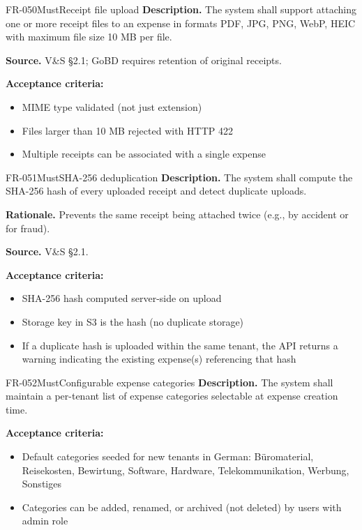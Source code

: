 \documentclass[11pt,a4paper]{article}
\begin{document}
\begin{requirement}{FR-050}{Must}{Receipt file upload}
\textbf{Description.} The system shall support attaching one or more receipt files to an expense in formats PDF, JPG, PNG, WebP, HEIC with maximum file size 10 MB per file.

\textbf{Source.} V\&S \S2.1; GoBD requires retention of original receipts.

\textbf{Acceptance criteria:}
\begin{itemize}
    \item MIME type validated (not just extension)
    \item Files larger than 10 MB rejected with HTTP 422
    \item Multiple receipts can be associated with a single expense
\end{itemize}
\end{requirement}

\begin{requirement}{FR-051}{Must}{SHA-256 deduplication}
\textbf{Description.} The system shall compute the SHA-256 hash of every uploaded receipt and detect duplicate uploads.

\textbf{Rationale.} Prevents the same receipt being attached twice (e.g., by accident or for fraud).

\textbf{Source.} V\&S \S2.1.

\textbf{Acceptance criteria:}
\begin{itemize}
    \item SHA-256 hash computed server-side on upload
    \item Storage key in S3 is the hash (no duplicate storage)
    \item If a duplicate hash is uploaded within the same tenant, the API returns a warning indicating the existing expense(s) referencing that hash
\end{itemize}
\end{requirement}

\begin{requirement}{FR-052}{Must}{Configurable expense categories}
\textbf{Description.} The system shall maintain a per-tenant list of expense categories selectable at expense creation time.

\textbf{Acceptance criteria:}
\begin{itemize}
    \item Default categories seeded for new tenants in German: B\"uromaterial, Reisekosten, Bewirtung, Software, Hardware, Telekommunikation, Werbung, Sonstiges
    \item Categories can be added, renamed, or archived (not deleted) by users with admin role
\end{itemize}
\end{requirement}
\end{document}
